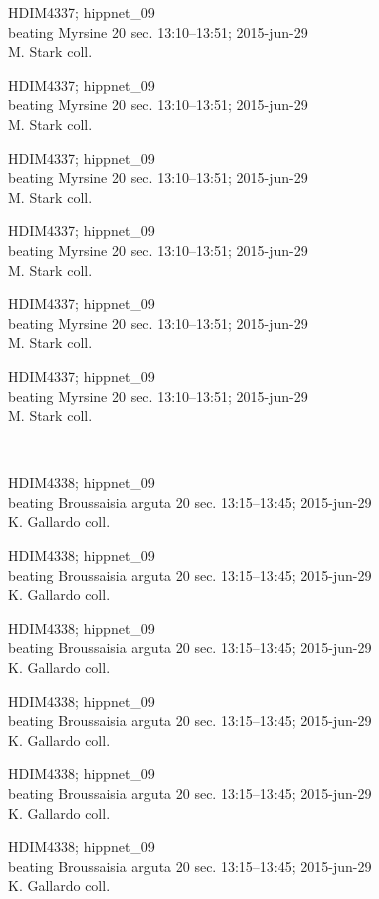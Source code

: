 \documentclass[2pt]{extarticle}
\begin{document}
\noindent
\parbox{0.16\textwidth}{\tiny \raggedright \rule[-0.3\baselineskip]{0pt}{10pt}HDIM4337; hippnet\_09\\ beating Myrsine 20 sec. 13:10--13:51; 2015-jun-29\\ M. Stark coll.}
\parbox{0.16\textwidth}{\tiny \raggedright \rule[-0.3\baselineskip]{0pt}{10pt}HDIM4337; hippnet\_09\\ beating Myrsine 20 sec. 13:10--13:51; 2015-jun-29\\ M. Stark coll.}
\parbox{0.16\textwidth}{\tiny \raggedright \rule[-0.3\baselineskip]{0pt}{10pt}HDIM4337; hippnet\_09\\ beating Myrsine 20 sec. 13:10--13:51; 2015-jun-29\\ M. Stark coll.}
\parbox{0.16\textwidth}{\tiny \raggedright \rule[-0.3\baselineskip]{0pt}{10pt}HDIM4337; hippnet\_09\\ beating Myrsine 20 sec. 13:10--13:51; 2015-jun-29\\ M. Stark coll.}
\parbox{0.16\textwidth}{\tiny \raggedright \rule[-0.3\baselineskip]{0pt}{10pt}HDIM4337; hippnet\_09\\ beating Myrsine 20 sec. 13:10--13:51; 2015-jun-29\\ M. Stark coll.}
\parbox{0.16\textwidth}{\tiny \raggedright \rule[-0.3\baselineskip]{0pt}{10pt}HDIM4337; hippnet\_09\\ beating Myrsine 20 sec. 13:10--13:51; 2015-jun-29\\ M. Stark coll.} \\ 
\vspace{0.001in} 

\noindent
\parbox{0.16\textwidth}{\tiny \raggedright \rule[-0.3\baselineskip]{0pt}{10pt}HDIM4338; hippnet\_09\\ beating Broussaisia arguta 20 sec. 13:15--13:45; 2015-jun-29\\ K. Gallardo coll.}
\parbox{0.16\textwidth}{\tiny \raggedright \rule[-0.3\baselineskip]{0pt}{10pt}HDIM4338; hippnet\_09\\ beating Broussaisia arguta 20 sec. 13:15--13:45; 2015-jun-29\\ K. Gallardo coll.}
\parbox{0.16\textwidth}{\tiny \raggedright \rule[-0.3\baselineskip]{0pt}{10pt}HDIM4338; hippnet\_09\\ beating Broussaisia arguta 20 sec. 13:15--13:45; 2015-jun-29\\ K. Gallardo coll.}
\parbox{0.16\textwidth}{\tiny \raggedright \rule[-0.3\baselineskip]{0pt}{10pt}HDIM4338; hippnet\_09\\ beating Broussaisia arguta 20 sec. 13:15--13:45; 2015-jun-29\\ K. Gallardo coll.}
\parbox{0.16\textwidth}{\tiny \raggedright \rule[-0.3\baselineskip]{0pt}{10pt}HDIM4338; hippnet\_09\\ beating Broussaisia arguta 20 sec. 13:15--13:45; 2015-jun-29\\ K. Gallardo coll.}
\parbox{0.16\textwidth}{\tiny \raggedright \rule[-0.3\baselineskip]{0pt}{10pt}HDIM4338; hippnet\_09\\ beating Broussaisia arguta 20 sec. 13:15--13:45; 2015-jun-29\\ K. Gallardo coll.} \\ 
\vspace{0.001in} 
\end{document}
